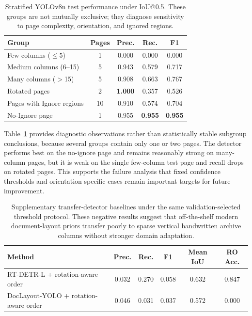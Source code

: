 \documentclass[12pt]{article}
\begin{document}
\begin{table}[t]
\centering
\caption{Stratified YOLOv8n test performance under IoU@0.5. These groups are not mutually exclusive; they diagnose sensitivity to page complexity, orientation, and ignored regions.}
\label{tab:stratified_yolo}
\begin{tabular}{lcccc}
\toprule
Group & Pages & Prec. & Rec. & F1 \\
\midrule
Few columns ($\leq$5) & 1 & 0.000 & 0.000 & 0.000 \\
Medium columns (6--15) & 5 & 0.943 & 0.579 & 0.717 \\
Many columns ($>$15) & 5 & 0.908 & 0.663 & 0.767 \\
Rotated pages & 2 & \textbf{1.000} & 0.357 & 0.526 \\
Pages with Ignore regions & 10 & 0.910 & 0.574 & 0.704 \\
No-Ignore page & 1 & 0.955 & \textbf{0.955} & \textbf{0.955} \\
\bottomrule
\end{tabular}
\end{table}

Table~\ref{tab:stratified_yolo} provides diagnostic observations rather than statistically stable subgroup conclusions, because several groups contain only one or two pages. The detector performs best on the no-ignore page and remains reasonably strong on many-column pages, but it is weak on the single few-column test page and recall drops on rotated pages. This supports the failure analysis that fixed confidence thresholds and orientation-specific cases remain important targets for future improvement.

\begin{table}[t]
\centering
\caption{Supplementary transfer-detector baselines under the same validation-selected threshold protocol. These negative results suggest that off-the-shelf modern document-layout priors transfer poorly to sparse vertical handwritten archive columns without stronger domain adaptation.}
\label{tab:transfer_baselines}
\begin{tabular}{lccccc}
\toprule
Method & Prec. & Rec. & F1 & Mean IoU & RO Acc. \\
\midrule
RT-DETR-L + rotation-aware order & 0.032 & 0.270 & 0.058 & 0.632 & 0.847 \\
DocLayout-YOLO + rotation-aware order & 0.046 & 0.031 & 0.037 & 0.572 & 0.000 \\
\bottomrule
\end{tabular}
\end{table}
\end{document}
